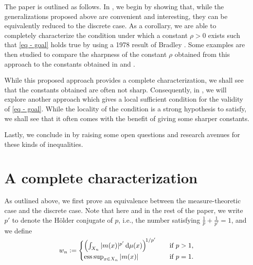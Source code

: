 \documentclass[oneside,10pt]{article}          %
\numberwithin{equation}{section}
\begin{document}
The paper is outlined as follows. In , we begin by showing that, while the generalizations proposed above are convenient and interesting, they can be equivalently reduced to the discrete case. As a corollary, we are able to completely characterize the condition under which a constant $\rho>0$ exists such that \eqref{eq - goal} holds true by using a 1978 result of Bradley \cite{Bradley}. Some examples are then studied to compare the sharpness of the constant $\rho$ obtained from this approach to the constants obtained in \cite{Bouthat2023} and \cite{VincentSohani2025}.

While this proposed approach provides a complete characterization, we shall see that the constants obtained are often not sharp. Consequently, in , we will explore another approach which gives a local sufficient condition for the validity of \eqref{eq - goal}. While the locality of the condition is a strong hypothesis to satisfy, we shall see that it often comes with the benefit of giving some sharper constants.

Lastly, we conclude in  by raising some open questions and research avenues for these kinds of inequalities.



\section{A complete characterization}\label{sec - charac}

As outlined above, we first prove an equivalence between the measure-theoretic case and the discrete case. Note that here and in the rest of the paper, we write $p'$ to denote the Hölder conjugate of $p$, i.e., the number satisfying $\frac{1}{p}+\frac{1}{p'}=1$, and we define
\begin{equation}\label{def - wn}
    w_n := \begin{cases}
        \left( \int_{X_n} |m(x)|^{p'}\,\mathrm{d}\mu(x) \right)^{\!\smash{1/p'}} \quad&\text{if }p>1,\\
        \operatorname*{ess\,sup}_{x \in X_n} |m(x)|\quad&\text{if }p=1.
    \end{cases}
\end{equation}


\end{document}
